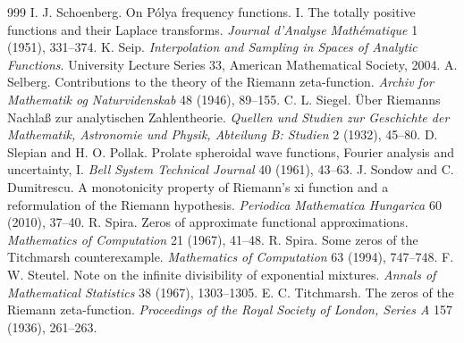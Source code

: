 \begin{thebibliography}{999}
 I. J. Schoenberg. On P\'olya frequency functions. I. The totally positive functions and their Laplace transforms. \emph{Journal d'Analyse Math\'ematique} 1 (1951), 331--374.
 K. Seip. \emph{Interpolation and Sampling in Spaces of Analytic Functions}. University Lecture Series 33, American Mathematical Society, 2004.
 A. Selberg. Contributions to the theory of the Riemann zeta-function. \emph{Archiv for Mathematik og Naturvidenskab} 48 (1946), 89--155.
 C. L. Siegel. \"Uber Riemanns Nachla{\ss} zur analytischen Zahlentheorie. \emph{Quellen und Studien zur Geschichte der Mathematik, Astronomie und Physik, Abteilung B: Studien} 2 (1932), 45--80.
 D. Slepian and H. O. Pollak. Prolate spheroidal wave functions, Fourier analysis and uncertainty, I. \emph{Bell System Technical Journal} 40 (1961), 43--63.
 J. Sondow and C. Dumitrescu. A monotonicity property of Riemann's xi function and a reformulation of the Riemann hypothesis. \emph{Periodica Mathematica Hungarica} 60 (2010), 37--40.
 R. Spira. Zeros of approximate functional approximations. \emph{Mathematics of Computation} 21 (1967), 41--48.
 R. Spira. Some zeros of the Titchmarsh counterexample. \emph{Mathematics of Computation} 63 (1994), 747--748.
 F. W. Steutel. Note on the infinite divisibility of exponential mixtures. \emph{Annals of Mathematical Statistics} 38 (1967), 1303--1305.
 E. C. Titchmarsh. The zeros of the Riemann zeta-function. \emph{Proceedings of the Royal Society of London, Series A} 157 (1936), 261--263.

\end{thebibliography}
